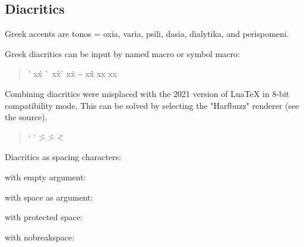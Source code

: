 \documentclass[a4paper]{article}
\begin{document}
\subsection{Diacritics}

Greek accents are
tonos = oxia, varia, psili, dasia, dialytika, and perispomeni.

Greek diacritics can be input by named macro or symbol macro:
\begin{quote}
  \acctonos\textalpha       \'\textalpha{}  \acctonos       x\'x
  \accvaria\textalpha       \`\textalpha{}  \accvaria       x\`x
  \accdialytika\textiota{}  \"\textiota{}   \accdialytika   x\"x
  \accperispomeni\textalpha \~\textalpha{}  \accperispomeni x\~x
  \accpsili\textalpha       \>\textalpha{}  \accpsili       x\>x
  \accdasia\textalpha       \<\textalpha{}  \accdasia       x\<x
\end{quote}
%
Combining diacritics were misplaced with the 2021 version of LuaTeX in 8-bit
compatibility mode. This can be solved by selecting the "Harfbuzz" renderer
(see the source).
\begin{quote}
  \accdasia`\textepsilon{} \accpsili'\textepsilon{} \~>\textupsilon{}
  \~>\textalpha\ypogegrammeni{} \~<\textalpha\ypogegrammeni
\end{quote}
%
Diacritics as spacing characters:

with empty argument:
\ensuregreek{
\acctonos{} \accoxia{} \accvaria{}
\accpsili{} \accdasia{}
\accdialytika{} \accperispomeni{}
\accdialytikatonos{} \accdialytikavaria{} \accdialytikaperispomeni{}
\accdasiaoxia{} \accdasiavaria{} \accdasiaperispomeni{}
\accpsilioxia{} \accpsilivaria{} \accpsiliperispomeni{}
}

with space as argument:
\ensuregreek{
\acctonos{ } \accoxia{ } \accvaria{ }
\accpsili{ } \accdasia{ }
\accdialytika{ } \accperispomeni{ }
\accdialytikatonos{ } \accdialytikavaria{ } \accdialytikaperispomeni{ }
\accdasiaoxia{ } \accdasiavaria{ } \accdasiaperispomeni{ }
\accpsilioxia{ } \accpsilivaria{ } \accpsiliperispomeni{ }
}

with protected space:
\ensuregreek{
\acctonos{\ } \accoxia{\ } \accvaria{\ }
\accpsili{\ } \accdasia{\ }
\accdialytika{\ } \accperispomeni{\ }
\accdialytikatonos{\ }\ \accdialytikavaria{\ }\ \accdialytikaperispomeni{\ }\
\accdasiaoxia{\ }\ \accdasiavaria{\ }\ \accdasiaperispomeni{\ }\
\accpsilioxia{\ }\ \accpsilivaria{\ }\ \accpsiliperispomeni{\ }
}

with nobreakspace:
\ensuregreek{
\acctonos{\nobreakspace} \accoxia{\nobreakspace} \accvaria{\nobreakspace}
\accpsili{\nobreakspace} \accdasia{\nobreakspace}
\accdialytika{\nobreakspace} \accperispomeni{\nobreakspace}
\accdialytikatonos{\nobreakspace}\ \accdialytikavaria{\nobreakspace}\
\accdialytikaperispomeni{\nobreakspace}\ \accdasiaoxia{\nobreakspace}\
\accdasiavaria{\nobreakspace}\ \accdasiaperispomeni{\nobreakspace}\
\accpsilioxia{\nobreakspace}\ \accpsilivaria{\nobreakspace}\
\accpsiliperispomeni{\nobreakspace}
}
\end{document}
